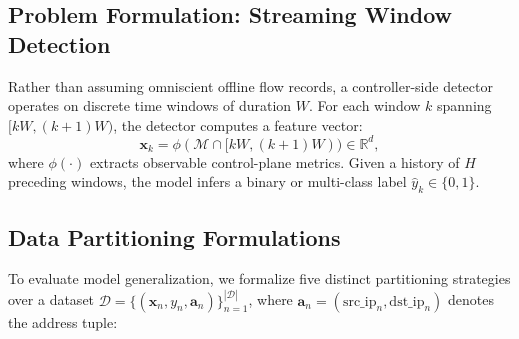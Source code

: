 \documentclass[journal]{IEEEtran}
\begin{document}
\subsection{Problem Formulation: Streaming Window Detection}
Rather than assuming omniscient offline flow records, a controller-side detector operates on discrete time windows of duration $W$. For each window $k$ spanning $[kW, (k+1)W)$, the detector computes a feature vector:
\begin{equation}
\mathbf{x}_k = \phi(\mathcal{M} \cap [kW, (k+1)W)) \in \mathbb{R}^d,
\end{equation}
where $\phi(\cdot)$ extracts observable control-plane metrics. Given a history of $H$ preceding windows, the model infers a binary or multi-class label $\hat{y}_k \in \{0, 1\}$.

\subsection{Data Partitioning Formulations}
To evaluate model generalization, we formalize five distinct partitioning strategies over a dataset $\mathcal{D} = \{(\mathbf{x}_n, y_n, \mathbf{a}_n)\}_{n=1}^{|\mathcal{D}|}$, where $\mathbf{a}_n = (\text{src\_ip}_n, \text{dst\_ip}_n)$ denotes the address tuple:
\end{document}
